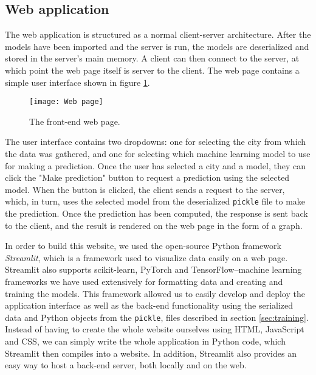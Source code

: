 \subsection{Web application}\label{sec:web app}
The web application is structured as a normal client-server architecture. After the models have been imported and the server is run, the models are deserialized and stored in the server's main memory.
A client can then connect to the server, at which point the web page itself is server to the client.
The web page contains a simple user interface shown in figure \ref{fig:web page}.

\begin{figure}[h]
	\centering
	\texttt{[image: Web page]}
	\caption{The front-end web page.}
	\label{fig:web page}
\end{figure}

The user interface contains two dropdowns: one for selecting the city from which the data was gathered, and one for selecting which machine learning model to use for making a prediction.
Once the user has selected a city and a model, they can click the "Make prediction" button to request a prediction using the selected model.
When the button is clicked, the client sends a request to the server, which, in turn, uses the selected model from the deserialized \texttt{pickle} file to make the prediction. 
Once the prediction has been computed, the response is sent back to the client, and the result is rendered on the web page in the form of a graph.

In order to build this website, we used the open-source Python framework \textit{Streamlit}\cite{streamlit}, which is a framework used to visualize data easily on a web page.
Streamlit also supports scikit-learn\cite{scikit-learn}, PyTorch\cite{pytorch} and TensorFlow\cite{tensorflow}--machine learning frameworks we have used extensively for formatting data and creating and training the models.
This framework allowed us to easily develop and deploy the application interface as well as the back-end functionality using the serialized data and Python objects from the \texttt{pickle}, files described in section \ref{sec:training}.
Instead of having to create the whole website ourselves using HTML, JavaScript and CSS, we can simply write the whole application in Python code, which Streamlit then compiles into a website.
In addition, Streamlit also provides an easy way to host a back-end server, both locally and on the web.

